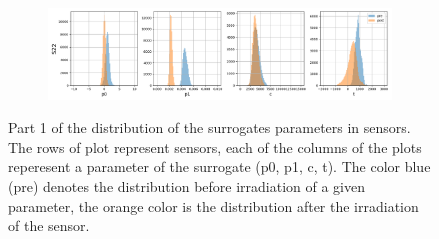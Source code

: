 \begin{figure}
\begin{subfigure}[b]{0.85\textwidth}
    \centering
    \includegraphics[width=\linewidth]{figures/chapter4/surrogates/p1_S22_histos.png}
  \end{subfigure}

\label{plot:sensor_surrogate_p1}
  \caption[Surrogate parameters distribution part 2]{Part 1 of the distribution of the surrogates parameters in sensors. The rows of plot represent sensors, each of the columns of the plots reperesent a parameter of the surrogate (p0, p1, c, t).  The color blue (pre) denotes the distribution before irradiation of a given parameter, the orange color is the distribution after the irradiation of the sensor. }
\end{figure}

